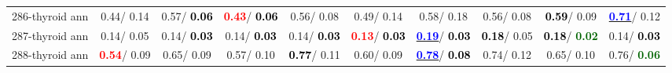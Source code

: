 \begin{table}[h]
\begin{center}
{\begin{tabular}{lc|c|c|c|c|c|c|c|c}
286-thyroid ann &   0.44/  0.14 &   0.57/\textcolor{black}{\textbf{  0.06}} & \textcolor{red}{\textbf{  0.43}}/\textcolor{black}{\textbf{  0.06}} &   0.56/  0.08 &   0.49/  0.14 &   0.58/  0.18 &   0.56/  0.08 & \textcolor{black}{\textbf{  0.59}}/  0.09 & \underline{\textcolor{blue}{\textbf{  0.71}}}/  0.12 \\
287-thyroid ann &   0.14/  0.05 &   0.14/\textcolor{black}{\textbf{  0.03}} &   0.14/\textcolor{black}{\textbf{  0.03}} &   0.14/\textcolor{black}{\textbf{  0.03}} & \textcolor{red}{\textbf{  0.13}}/\textcolor{black}{\textbf{  0.03}} & \underline{\textcolor{blue}{\textbf{  0.19}}}/\textcolor{black}{\textbf{  0.03}} & \textcolor{black}{\textbf{  0.18}}/  0.05 & \textcolor{black}{\textbf{  0.18}}/\textcolor{darkgreen}{\textbf{  0.02}} &   0.14/\textcolor{black}{\textbf{  0.03}} \\
288-thyroid ann & \textcolor{red}{\textbf{  0.54}}/  0.09 &   0.65/  0.09 &   0.57/  0.10 & \textcolor{black}{\textbf{  0.77}}/  0.11 &   0.60/  0.09 & \underline{\textcolor{blue}{\textbf{  0.78}}}/\textcolor{black}{\textbf{  0.08}} &   0.74/  0.12 &   0.65/  0.10 &   0.76/\textcolor{darkgreen}{\textbf{  0.06}} \\\end{tabular}}\label{stratsALCKappa8AllReduxalla}
\end{center}
\end{table}
